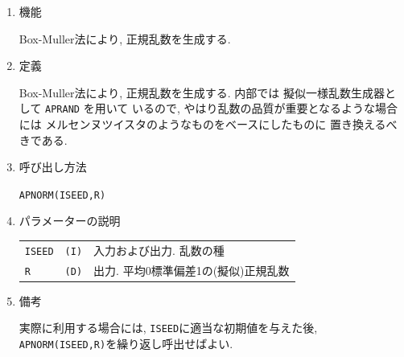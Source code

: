 \documentclass[a4j]{jarticle}
\begin{document}
\begin{enumerate}

\item 機能 

Box-Muller法により, 正規乱数を生成する.

\item 定義

Box-Muller法により, 正規乱数を生成する. 内部では
擬似一様乱数生成器として {\tt APRAND} を用いて
いるので, やはり乱数の品質が重要となるような場合には
メルセンヌツイスタのようなものをベースにしたものに
置き換えるべきである.

\item 呼び出し方法 
    
{\tt APNORM(ISEED,R)}
  
\item パラメーターの説明 
    
\begin{tabular}{lll}
{\tt ISEED} & {\tt (I)} & 入力および出力. 乱数の種\\
{\tt R} & {\tt (D)} & 出力. 平均0標準偏差1の(擬似)正規乱数
\end{tabular}

\item 備考

実際に利用する場合には, {\tt ISEED}に適当な初期値を与えた後,
{\tt APNORM(ISEED,R)}を繰り返し呼出せばよい.

\end{enumerate}
\end{document}

